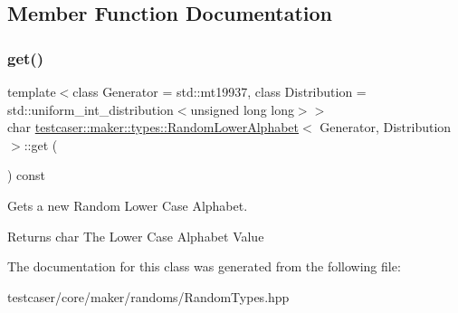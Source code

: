 \subsection{Member Function Documentation}
\mbox{\label{classtestcaser_1_1maker_1_1types_1_1RandomLowerAlphabet_a483c6ff333747eec0d212c1293aa5d59}} 
\subsubsection{\texorpdfstring{get()}{get()}}
{\footnotesize\ttfamily template$<$class Generator = std\+::mt19937, class Distribution = std\+::uniform\+\_\+int\+\_\+distribution$<$unsigned long long$>$$>$ \\
char \mbox{\hyperlink{classtestcaser_1_1maker_1_1types_1_1RandomLowerAlphabet}{testcaser\+::maker\+::types\+::\+Random\+Lower\+Alphabet}}$<$ Generator, Distribution $>$\+::get (\begin{DoxyParamCaption}{ }\end{DoxyParamCaption}) const\hspace{0.3cm}{\ttfamily [inline]}}



Gets a new Random Lower Case Alphabet. 

\begin{DoxyReturn}{Returns}
char The Lower Case Alphabet Value 
\end{DoxyReturn}


The documentation for this class was generated from the following file\+:\begin{DoxyCompactItemize}
\item 
testcaser/core/maker/randoms/Random\+Types.\+hpp\end{DoxyCompactItemize}
